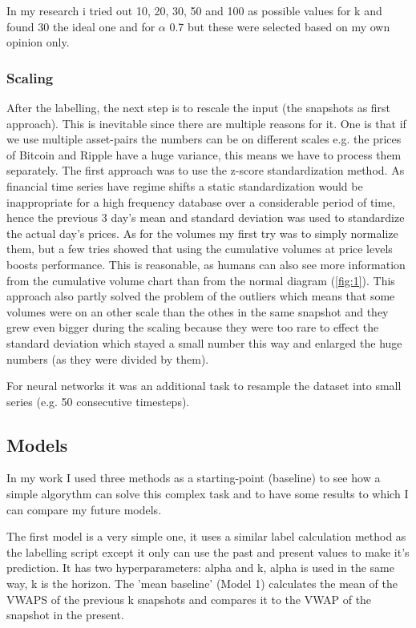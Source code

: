 \documentclass[11pt,a4paper,oneside]{article}
\begin{document}
  In my research i tried out 10, 20, 30, 50 and 100 as possible values for k and found 30 the ideal one and for 
  $\alpha$ 0.7 but these were selected based on my own opinion only.

  \subsubsection{Scaling}
  \label{scaling}

  After the labelling, the next step is to rescale the input (the snapshots as first approach). This is inevitable since 
  there are multiple reasons for it. One is that if we use multiple asset-pairs the numbers can be on different scales 
  e.g. the prices of Bitcoin and Ripple have a huge variance, this means we have to process them separately. The first 
  approach was to use the z-score standardization method. As financial time series have regime shifts a static 
  standardization would be inappropriate for a high frequency database over a considerable period of time, hence the 
  previous 3 day's mean and standard deviation was used to standardize the actual day's prices. As for the volumes my 
  first try was to simply normalize them, but a few tries showed that using the cumulative volumes at price levels 
  boosts performance. This is reasonable, as humans can also see more information from the cumulative volume chart than 
  from the normal diagram (\ref{fig:1}). This approach also partly solved the problem of the outliers which means that 
  some volumes were on an other scale than the othes in the same snapshot and they grew even bigger during the scaling 
  because they were too rare to effect the standard deviation which stayed a small number this way and enlarged the huge 
  numbers (as they were divided by them).

  For neural networks it was an additional task to resample the dataset into small series (e.g. 50 consecutive 
  timesteps).

\subsection{Models}
\label{models}

In my work I used three methods as a starting-point (baseline) to see how a simple algorythm can solve this complex task 
and to have some results to which I can compare my future models. 

The first model is a very simple one, it uses a similar label calculation method as the labelling script except it only 
can use the past and present values to make it's prediction. It has two hyperparameters: alpha and k, alpha is used in 
the same way, k is the horizon. The 'mean baseline' (Model 1) calculates the mean of the VWAPS of the previous k 
snapshots and compares it to the VWAP of the snapshot in the present. 
\end{document}
